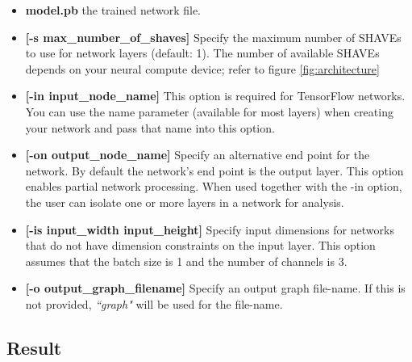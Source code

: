 \begin{itemize}
\item \textbf{model.pb} the trained network file.
\item \textbf{[-s max\_number\_of\_shaves]} Specify the maximum number of SHAVEs 
to use for network layers (default: 1).
The number of available SHAVEs depends on your neural compute device; refer to 
figure \ref{fig:architecture}
\item \textbf{[-in input\_node\_name]} This option is required for TensorFlow 
networks. 
You can use the name parameter (available for most layers) when creating your 
network and pass that name into this option.
\item \textbf{[-on output\_node\_name]} Specify an alternative end point for the 
network. 
By default the network’s end point is the output layer. 
This option enables partial network processing. When used together with the 
-in option, the user can isolate one or more layers in a network for analysis.
\item \textbf{[-is input\_width input\_height]} Specify input dimensions for 
networks that do not have dimension constraints on the input layer.
This option assumes that the batch size is 1 and the number of channels is 3.
\item \textbf{[-o output\_graph\_filename]} Specify an output graph file-name. 
If this is not provided, \emph{``graph"} will be used for the file-name.
\end{itemize}

\subsection{Result}
\label{subsec:result}
